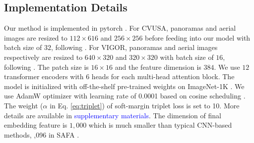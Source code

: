 \documentclass[10pt,twocolumn,letterpaper]{article}
\begin{document}
\subsection{Implementation Details}
Our method is implemented in pytorch \cite{paszke2019pytorch}. For CVUSA, panoramas and aerial images are resized to $112\times 616$ and $256\times 256$ before feeding into our model with batch size of $32$, following \cite{SAFA}. For VIGOR, panoramas and aerial images respectively are resized to $640\times 320$ and $320\times 320$ with batch size of $16$, following \cite{zhu2021vigor}. The patch size is $16\times 16$ and the feature dimension is $384$. We use $12$ transformer encoders with $6$ heads for each multi-head attention block. The model is initialized with off-the-shelf pre-trained weights \cite{deit} on ImageNet-1K \cite{deng2009imagenet}. We use AdamW \cite{loshchilov2017decoupled} optimizer with learning rate of 0.0001 based on cosine scheduling \cite{loshchilov2016sgdr}. The weight ($\alpha$ in Eq. \ref{eq:triplet}) of soft-margin triplet loss \cite{CVM} is set to 10. More details are available in \textcolor{blue}{supplementary materials}. The dimension of final embedding feature is $1,000$ which is much smaller than typical CNN-based methods, ,096 in SAFA \cite{SAFA}. 
\end{document}
